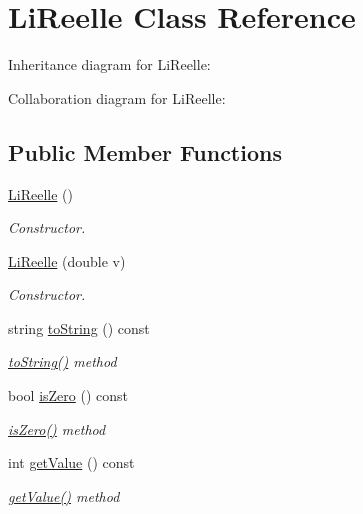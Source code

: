 \hypertarget{class_li_reelle}{}\section{Li\+Reelle Class Reference}
\label{class_li_reelle}


Inheritance diagram for Li\+Reelle\+:


Collaboration diagram for Li\+Reelle\+:
\subsection*{Public Member Functions}
\begin{DoxyCompactItemize}
\item 
\hyperlink{class_li_reelle_a541e99341e86ade2967c4724becf2f1d}{Li\+Reelle} ()
\begin{DoxyCompactList}\small\item\em Constructor. \end{DoxyCompactList}\item 
\hyperlink{class_li_reelle_a45ab61569416dc569194ef80d27a07c5}{Li\+Reelle} (double v)
\begin{DoxyCompactList}\small\item\em Constructor. \end{DoxyCompactList}\item 
string \hyperlink{class_li_reelle_ad78df00afab6b86f6b0ec966f848c872}{to\+String} () const 
\begin{DoxyCompactList}\small\item\em \hyperlink{class_li_reelle_ad78df00afab6b86f6b0ec966f848c872}{to\+String()} method \end{DoxyCompactList}\item 
bool \hyperlink{class_li_reelle_a0470145a910d993012e9f6c5f8896b08}{is\+Zero} () const 
\begin{DoxyCompactList}\small\item\em \hyperlink{class_li_reelle_a0470145a910d993012e9f6c5f8896b08}{is\+Zero()} method \end{DoxyCompactList}\item 
int \hyperlink{class_li_reelle_a535bb0861646fbf417d05196e13092b0}{get\+Value} () const 
\begin{DoxyCompactList}\small\item\em \hyperlink{class_li_reelle_a535bb0861646fbf417d05196e13092b0}{get\+Value()} method \end{DoxyCompactList}\item 

\end{DoxyCompactItemize}
